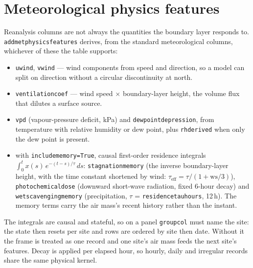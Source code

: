 \documentclass[11pt]{report}
\newcommand{\nosep}{\setlength{\itemsep}{0pt}\setlength{\parskip}{0pt}\setlength{\topsep}{2pt}}
\newcommand{\codeunderscore}{\textunderscore\allowbreak}
\newcommand{\code}[1]{\texttt{\let\_\codeunderscore #1}}
\begin{document}
\section{Meteorological physics features}\label{sec:metfeaturestheory}
Reanalysis columns are not always the quantities the boundary layer responds to.
\code{add\_met\_physics\_features} derives, from the standard meteorological
columns, whichever of these the table supports:
\begin{itemize}\nosep
  \item \code{u\_wind}, \code{v\_wind} --- wind components from speed and direction,
        so a model can split on direction without a circular discontinuity at north.
  \item \code{ventilation\_coef} --- wind speed $\times$ boundary-layer height, the
        volume flux that dilutes a surface source.
  \item \code{vpd} (vapour-pressure deficit, kPa) and \code{dewpoint\_depression},
        from temperature with relative humidity or dew point, plus \code{rh\_derived}
        when only the dew point is present.
  \item with \code{include\_memory=True}, causal first-order residence integrals
        $\int_0^t x(s)\,e^{-(t-s)/\tau}\,ds$: \code{stagnation\_memory} (the inverse
        boundary-layer height, with the time constant shortened by wind:
        $\tau_\text{eff} = \tau/(1 + \mathrm{ws}/3)$), \code{photochemical\_dose}
        (downward short-wave radiation, fixed 6-hour decay) and
        \code{wet\_scavenging\_memory} (precipitation, $\tau$ =
        \code{residence\_tau\_hours}, 12\,h). The memory terms carry the air mass's
        recent history rather than the instant.
\end{itemize}
The integrals are causal and stateful, so on a panel \code{group\_col} must name the
site: the state then resets per site and rows are ordered by site then date. Without
it the frame is treated as one record and one site's air mass feeds the next site's
features. Decay is applied per elapsed hour, so hourly, daily and irregular records
share the same physical kernel.
\end{document}
